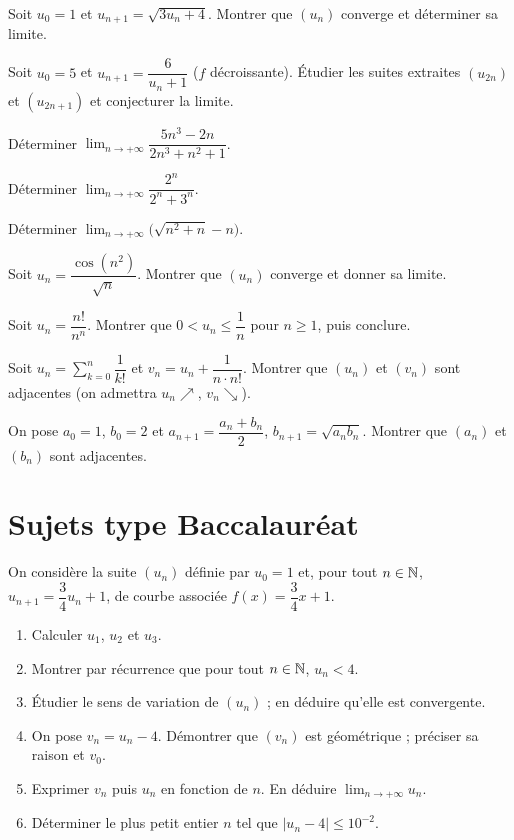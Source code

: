 \exo{} Soit $u_0=1$ et $u_{n+1}=\sqrt{3u_n+4}$. Montrer que $(u_n)$ converge et déterminer sa limite.

\exo{} Soit $u_0=5$ et $u_{n+1}=\dfrac{6}{u_n+1}$ ($f$ décroissante). Étudier les suites
extraites $(u_{2n})$ et $(u_{2n+1})$ et conjecturer la limite.

\exo{} Déterminer $\displaystyle\lim_{n\to+\infty}\dfrac{5n^3-2n}{2n^3+n^2+1}$.

\exo{} Déterminer $\displaystyle\lim_{n\to+\infty}\dfrac{2^n}{2^n+3^n}$.

\exo{} Déterminer $\displaystyle\lim_{n\to+\infty}\bigl(\sqrt{n^2+n}-n\bigr)$.

\exo{} Soit $u_n=\dfrac{\cos(n^2)}{\sqrt n}$. Montrer que $(u_n)$ converge et donner sa limite.

\exo{} Soit $u_n=\dfrac{n!}{n^n}$. Montrer que $0<u_n\le\dfrac1n$ pour $n\ge1$, puis conclure.

\exo{} Soit $u_n=\displaystyle\sum_{k=0}^{n}\dfrac1{k!}$ et $v_n=u_n+\dfrac1{n\cdot n!}$.
Montrer que $(u_n)$ et $(v_n)$ sont adjacentes (on admettra $u_n\nearrow$, $v_n\searrow$).

\exo{} On pose $a_0=1$, $b_0=2$ et $a_{n+1}=\dfrac{a_n+b_n}{2}$, $b_{n+1}=\sqrt{a_n b_n}$.
Montrer que $(a_n)$ et $(b_n)$ sont adjacentes.

\section{Sujets type Baccalauréat}

On considère la suite $(u_n)$ définie par $u_0=1$ et, pour tout $n\in\mathbb{N}$,
$u_{n+1}=\dfrac34 u_n+1$, de courbe associée $f(x)=\dfrac34 x+1$.
\begin{enumerate}[label=\arabic*)]
\item Calculer $u_1$, $u_2$ et $u_3$.
\item Montrer par récurrence que pour tout $n\in\mathbb{N}$, $u_n<4$.
\item Étudier le sens de variation de $(u_n)$ ; en déduire qu'elle est convergente.
\item On pose $v_n=u_n-4$. Démontrer que $(v_n)$ est géométrique ; préciser sa raison et $v_0$.
\item Exprimer $v_n$ puis $u_n$ en fonction de $n$. En déduire $\displaystyle\lim_{n\to+\infty}u_n$.
\item Déterminer le plus petit entier $n$ tel que $|u_n-4|\le10^{-2}$.
\end{enumerate}

